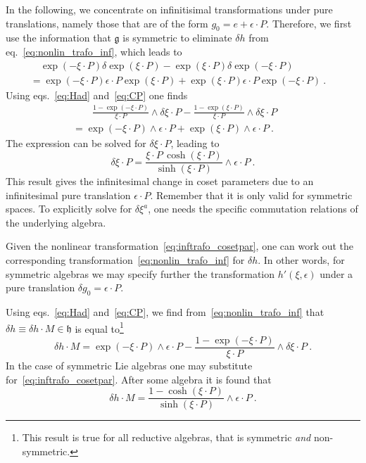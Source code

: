 \documentclass[11pt]{article}
\begin{document}
In the following, we concentrate on infinitisimal transformations 
under pure translations, namely those that are of the form $g_0 = 
e + \epsilon\cdot P$.  Therefore, we first use the information 
that $\mathfrak{g}$ is symmetric to eliminate $\delta h$ from 
eq.~\eqref{eq:nonlin_trafo_inf}, which leads to
%
\begin{multline*}
	\quad
	\exp(-\xi\cdot P)\delta\exp(\xi\cdot P) - \exp(\xi\cdot 
	P)\delta\exp(-\xi\cdot P) \\= \exp(-\xi\cdot P) \epsilon\cdot 
	P \exp(\xi\cdot P) + \exp(\xi\cdot P) \epsilon\cdot P 
	\exp(-\xi\cdot P)~.
	\quad
\end{multline*}
Using eqs.~\eqref{eq:Had} and~\eqref{eq:CP} one finds
%
\begin{multline*}
	\quad\quad
	\frac{1-\exp(-\xi\cdot P)}{\xi\cdot P} \wedge \delta\xi\cdot P 
	- \frac{1-\exp(\xi\cdot P)}{\xi\cdot P} \wedge \delta\xi\cdot 
	P \\
	= \exp(-\xi\cdot P) \wedge \epsilon\cdot P + \exp(\xi\cdot P) 
	\wedge \epsilon\cdot P~.
	\quad\quad
\end{multline*}
The expression can be solved for $\delta\xi\cdot P$, leading to
%
\begin{equation}\label{eq:inftrafo_cosetpar}
	\delta\xi \cdot P = \frac{\xi\cdot P\,\cosh(\xi\cdot 
		P)}{\sinh(\xi\cdot P)} \wedge \epsilon\cdot P~.
\end{equation}
This result gives the infinitesimal change in coset parameters 
due to an infinitesimal pure translation $\epsilon\cdot P$.  
Remember that it is only valid for symmetric spaces. To 
explicitly solve for $\delta \xi ^a$, one needs the specific 
commutation relations of the underlying algebra.

\blankline
Given the nonlinear transformation~\eqref{eq:inftrafo_cosetpar}, 
one can work out the corresponding 
transformation~\eqref{eq:nonlin_trafo_inf} for $\delta h$. In 
other words, for symmetric algebras we may specify further the 
transformation $h'(\xi,\epsilon)$ under a pure translation 
$\delta g_0 = \epsilon\cdot P$.

Using eqs.~\eqref{eq:Had} and~\eqref{eq:CP}, we find 
from~\eqref{eq:nonlin_trafo_inf} that $\delta h \equiv \delta h 
\cdot M \in \mathfrak{h}$ is equal to\footnote{This result is 
	true for all reductive algebras, that is symmetric \emph{and} 
	non-symmetric.}
%
\begin{equation}
	\delta h \cdot M = \exp(-\xi\cdot P) \wedge \epsilon\cdot P - 
	\frac{1-\exp(-\xi\cdot P)}{\xi\cdot P} \wedge \delta\xi \cdot 
	P~.
\end{equation}
In the case of symmetric Lie algebras one may substitute 
for~\eqref{eq:inftrafo_cosetpar}. After some algebra it is found 
that
%
\begin{equation}\label{eq:inftrafo_h}
	\delta h \cdot M = \frac{1-\cosh(\xi\cdot P)}{\sinh(\xi\cdot 
		P)} \wedge \epsilon\cdot P~.
\end{equation}
\end{document}

